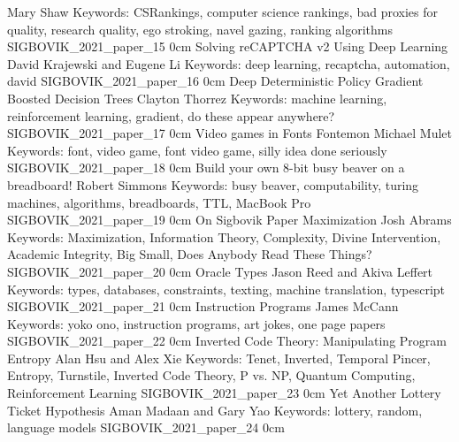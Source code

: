 	{Mary Shaw}
	{Keywords: CSRankings, computer science rankings, bad proxies for quality, research quality, ego stroking, navel gazing, ranking algorithms}
	{SIGBOVIK_2021_paper_15}
	{0cm}
	{}
\addpaper
	{Solving reCAPTCHA v2 Using Deep Learning}
	{David Krajewski and Eugene Li}
	{Keywords: deep learning, recaptcha, automation, david}
	{SIGBOVIK_2021_paper_16}
	{0cm}
	{}
\addpaper
	{Deep Deterministic Policy Gradient Boosted Decision Trees}
	{Clayton Thorrez}
	{Keywords: machine learning, reinforcement learning, gradient, do these appear anywhere?}
	{SIGBOVIK_2021_paper_17}
	{0cm}
	{}
\addpaper
	{Video games in Fonts Fontemon}
	{Michael Mulet}
	{Keywords: font, video game, font video game, silly idea done seriously}
	{SIGBOVIK_2021_paper_18}
	{0cm}
	{}
\addpaper
	{Build your own 8-bit busy beaver on a breadboard!}
	{Robert Simmons}
	{Keywords: busy beaver, computability, turing machines, algorithms, breadboards, TTL, MacBook Pro}
	{SIGBOVIK_2021_paper_19}
	{0cm}
	{}
\addpaper
	{On Sigbovik Paper Maximization}
	{Josh Abrams}
	{Keywords: Maximization, Information Theory, Complexity, Divine Intervention, Academic Integrity, Big Small, Does Anybody Read These Things?}
	{SIGBOVIK_2021_paper_20}
	{0cm}
	{}
\addpaper
	{Oracle Types}
	{Jason Reed and Akiva Leffert}
	{Keywords: types, databases, constraints, texting, machine translation, typescript}
	{SIGBOVIK_2021_paper_21}
	{0cm}
	{}
\addpaper
	{Instruction Programs}
	{James McCann}
	{Keywords: yoko ono, instruction programs, art jokes, one page papers}
	{SIGBOVIK_2021_paper_22}
	{0cm}
	{}
\addpaper
	{Inverted Code Theory: Manipulating Program Entropy}
	{Alan Hsu and Alex Xie}
	{Keywords: Tenet, Inverted, Temporal Pincer, Entropy, Turnstile, Inverted Code Theory, P vs. NP, Quantum Computing, Reinforcement Learning}
	{SIGBOVIK_2021_paper_23}
	{0cm}
	{}
\addpaper
	{Yet Another Lottery Ticket Hypothesis}
	{Aman Madaan and Gary Yao}
	{Keywords: lottery, random, language models}
	{SIGBOVIK_2021_paper_24}
	{0cm}
	{}

